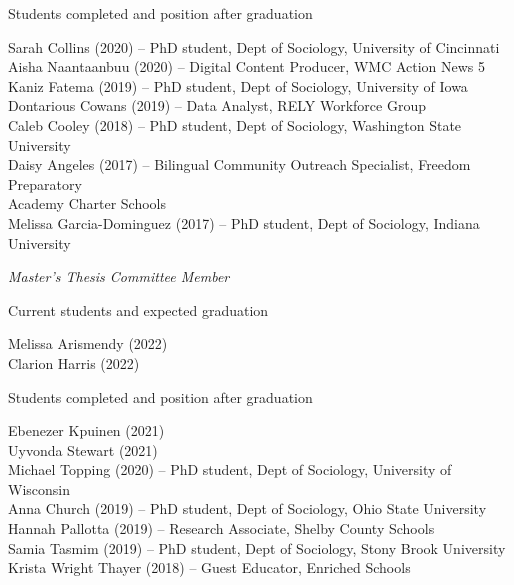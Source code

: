 \documentclass[11pt,]{article}
\begin{document}
\setlength{\leftskip}{0pt}

\setlength{\leftskip}{0.5cm}

Students completed and position after graduation

\setlength{\leftskip}{0pt}
\setlength{\leftskip}{1cm}

Sarah Collins (2020) -- PhD student, Dept of Sociology, University of
Cincinnati\\
Aisha Naantaanbuu (2020) -- Digital Content Producer, WMC Action News
5\\
Kaniz Fatema (2019) -- PhD student, Dept of Sociology, University of
Iowa\\
Dontarious Cowans (2019) -- Data Analyst, RELY Workforce Group\\
Caleb Cooley (2018) -- PhD student, Dept of Sociology, Washington State
University\\
Daisy Angeles (2017) -- Bilingual Community Outreach Specialist, Freedom
Preparatory\\
\hspace*{0.333em}\hspace*{0.333em}\hspace*{0.333em}\hspace*{0.333em}Academy
Charter Schools\\
Melissa Garcia-Dominguez (2017) -- PhD student, Dept of Sociology,
Indiana University

\setlength{\leftskip}{0pt}

\emph{Master's Thesis Committee Member}

\setlength{\leftskip}{0.5cm}

Current students and expected graduation

\setlength{\leftskip}{0pt}
\setlength{\leftskip}{1cm}

Melissa Arismendy (2022)\\
Clarion Harris (2022)

\setlength{\leftskip}{0pt}

\setlength{\leftskip}{0.5cm}

Students completed and position after graduation

\setlength{\leftskip}{0pt}
\setlength{\leftskip}{1cm}

Ebenezer Kpuinen (2021)\\
Uyvonda Stewart (2021)\\
Michael Topping (2020) -- PhD student, Dept of Sociology, University of
Wisconsin\\
Anna Church (2019) -- PhD student, Dept of Sociology, Ohio State
University\\
Hannah Pallotta (2019) -- Research Associate, Shelby County Schools\\
Samia Tasmim (2019) -- PhD student, Dept of Sociology, Stony Brook
University\\
Krista Wright Thayer (2018) -- Guest Educator, Enriched Schools
\end{document}
